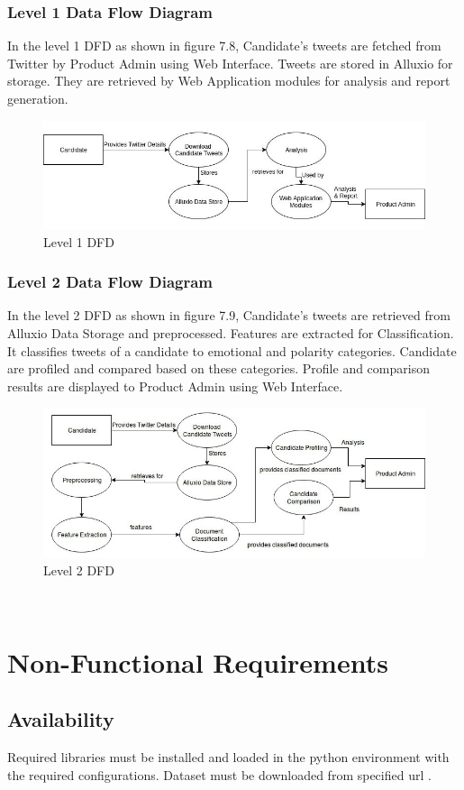 \documentclass[oneside,a4paper,12pt]{pictreport}
\begin{document}
\subsubsection{Level 1 Data Flow Diagram}
In the level 1 DFD as shown in figure 7.8, Candidate's tweets are fetched from Twitter by Product Admin using Web Interface. Tweets are stored in Alluxio for storage. They are retrieved by Web Application modules for analysis and report generation.\\
\begin{figure}[h!]
\includegraphics[width=4.5in]{DFD-1.jpg}
\caption{Level 1 DFD}
\end{figure}

\subsubsection{Level 2 Data Flow Diagram}
In the level 2 DFD as shown in figure 7.9, Candidate's tweets are retrieved from Alluxio Data Storage and preprocessed. Features are extracted for Classification. It classifies tweets of a candidate to emotional and polarity categories. Candidate are profiled and compared based on these categories. Profile and comparison results are displayed to Product Admin using Web Interface.\\
\begin{figure}[h!]
\includegraphics[width=4.5in]{DFD-2.jpg}
\caption{Level 2 DFD}
\end{figure}
\\
\section{Non-Functional Requirements}
\subsection{Availability}
Required libraries must be installed and loaded in the python environment with the required configurations. Dataset must be downloaded from specified url \cite{dataset}.
\end{document}
